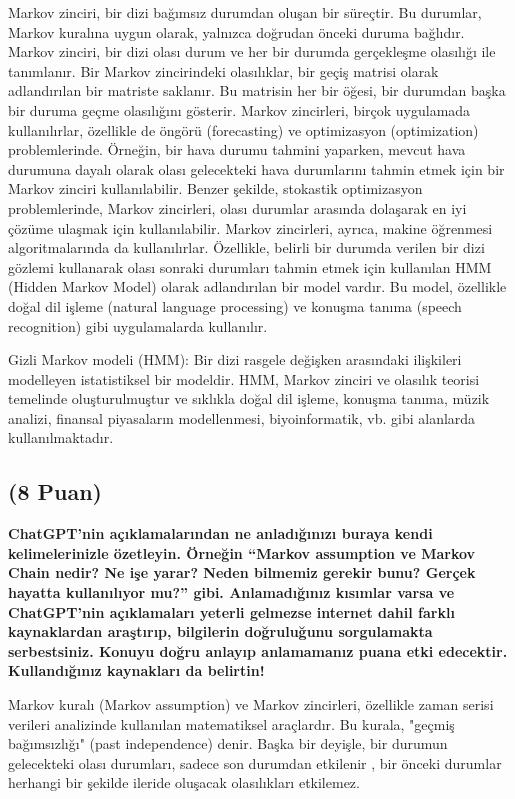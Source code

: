 \documentclass[11pt]{article}
\begin{document}
Markov zinciri, bir dizi bağımsız durumdan oluşan bir süreçtir. Bu durumlar, Markov kuralına uygun olarak, yalnızca doğrudan önceki duruma bağlıdır. Markov zinciri, bir dizi olası durum ve her bir durumda gerçekleşme olasılığı ile tanımlanır. Bir Markov zincirindeki olasılıklar, bir geçiş matrisi olarak adlandırılan bir matriste saklanır. Bu matrisin her bir öğesi, bir durumdan başka bir duruma geçme olasılığını gösterir.
Markov zincirleri, birçok uygulamada kullanılırlar, özellikle de öngörü (forecasting) ve optimizasyon (optimization) problemlerinde. Örneğin, bir hava durumu tahmini yaparken, mevcut hava durumuna dayalı olarak olası gelecekteki hava durumlarını tahmin etmek için bir Markov zinciri kullanılabilir. Benzer şekilde, stokastik optimizasyon problemlerinde, Markov zincirleri, olası durumlar arasında dolaşarak en iyi çözüme ulaşmak için kullanılabilir.
Markov zincirleri, ayrıca, makine öğrenmesi algoritmalarında da kullanılırlar. Özellikle, belirli bir durumda verilen bir dizi gözlemi kullanarak olası sonraki durumları tahmin etmek için kullanılan HMM (Hidden Markov Model) olarak adlandırılan bir model vardır. Bu model, özellikle doğal dil işleme (natural language processing) ve konuşma tanıma (speech recognition) gibi uygulamalarda kullanılır.

Gizli Markov modeli (HMM): Bir dizi rasgele değişken arasındaki ilişkileri modelleyen istatistiksel bir modeldir. HMM, Markov zinciri ve olasılık teorisi temelinde oluşturulmuştur ve sıklıkla doğal dil işleme, konuşma tanıma, müzik analizi, finansal piyasaların modellenmesi, biyoinformatik, vb. gibi alanlarda kullanılmaktadır.

\subsection{(8 Puan)} \textbf{ChatGPT’nin açıklamalarından ne anladığınızı buraya kendi kelimelerinizle özetleyin. Örneğin ``Markov assumption ve Markov Chain nedir? Ne işe yarar? Neden bilmemiz gerekir bunu? Gerçek hayatta kullanılıyor mu?'' gibi. Anlamadığınız kısımlar varsa ve ChatGPT’nin açıklamaları yeterli gelmezse internet dahil farklı kaynaklardan araştırıp, bilgilerin doğruluğunu sorgulamakta serbestsiniz. Konuyu doğru anlayıp anlamamanız puana etki edecektir. Kullandığınız kaynakları da belirtin!}

 Markov kuralı (Markov assumption) ve Markov zincirleri, özellikle zaman serisi verileri analizinde kullanılan matematiksel araçlardır. Bu kurala, "geçmiş bağımsızlığı" (past independence) denir. Başka bir deyişle, bir durumun gelecekteki olası durumları, sadece son durumdan etkilenir , bir önceki durumlar herhangi bir şekilde ileride oluşacak olasılıkları etkilemez.
\end{document}
